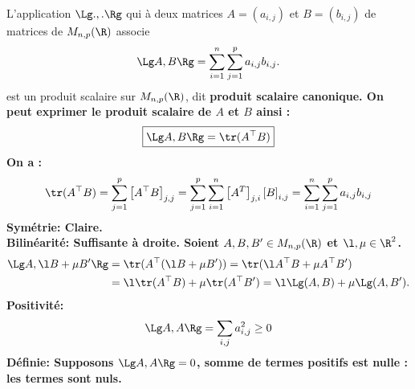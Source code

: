 \documentclass[11pt]{article}
\begin{document}
\begin{prop}{}{}
    L'application $\Lg ., . \Rg$ qui à deux matrices $A=(a_{i,j})$ et $B=(b_{i,j})$ de matrices de $M_{n,p}(\R)$ associe
    \begin{equation*}
        \Lg A, B \Rg = \sum_{i=1}^n\sum_{j=1}^pa_{i,j}b_{i,j}.
    \end{equation*}
    est un produit scalaire sur $M_{n,p}(\R)$, dit \bf{produit scalaire canonique.}\n
    On peut exprimer le produit scalaire de $A$ et $B$ ainsi :
    \begin{equation*}
        \boxed{\Lg A, B \Rg = \tr(A^\top B)}
    \end{equation*}
    \tcblower
    On a :
    \begin{equation*}
        \tr(A^\top B) = \sum_{j=1}^p\left[ A^\top B \right]_{j,j} = \sum_{j=1}^p\sum_{i=1}^n\left[ A^T \right]_{j,i}\left[ B \right]_{i,j} = \sum_{i=1}^n\sum_{j=1}^pa_{i,j}b_{i,j}
    \end{equation*}
    \bf{Symétrie:} Claire.\\
    \bf{Bilinéarité:} Suffisante à droite. Soient $A,B,B'\in M_{n,p}(\R)$ et $\l,\mu\in\R^2$.
    \begin{align*}
        \Lg A, \l B + \mu B' \Rg &= \tr(A^\top(\l B + \mu B')) = \tr(\l A^\top B + \mu A^\top B')\\
        &= \l\tr(A^\top B) + \mu\tr(A^\top B')=\l\Lg(A,B)+\mu\Lg(A,B').
    \end{align*}
    \bf{Positivité:}
    \begin{equation*}
        \Lg A, A \Rg = \sum_{i,j}a_{i,j}^2\geq0
    \end{equation*}
    \bf{Définie:} Supposons $\Lg A,A \Rg = 0$, somme de termes positifs est nulle : les termes sont nuls.
\end{prop}

\vspace*{-0.4cm}
\end{document}
